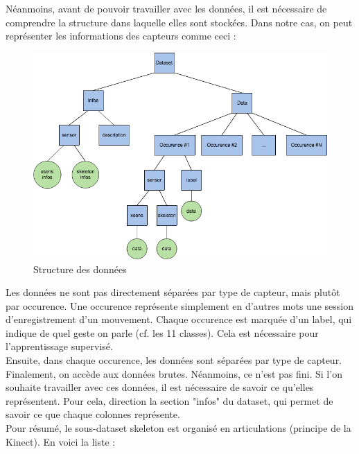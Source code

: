 Néanmoins, avant de pouvoir travailler avec les données, il est nécessaire de comprendre la structure dans laquelle elles sont stockées. Dans notre cas, on peut représenter les informations des capteurs comme ceci :

\begin{figure}[h]
  \centering
    \includegraphics[width=0.8\linewidth]{img/ann/extract/ann_dataset_mpri.png}
  \caption{Structure des données}
  \label{fig:dataset_mpri}
\end{figure}

Les données ne sont pas directement séparées par type de capteur, mais plutôt par occurence. Une occurence représente simplement en d'autres mots une session d'enregistrement d'un mouvement. Chaque occurence est marquée d'un label, qui indique de quel geste on parle (cf. les 11 classes). Cela est nécessaire pour l'apprentissage supervisé. \\

Ensuite, dans chaque occurence, les données sont séparées par type de capteur. Finalement, on accède aux données brutes. Néanmoins, ce n'est pas fini. Si l'on souhaite travailler avec ces données, il est nécessaire de savoir ce qu'elles représentent. Pour cela, direction la section "infos" du dataset, qui permet de savoir ce que chaque colonnes représente. \\

Pour résumé, le sous-dataset skeleton est organisé en articulations (principe de la Kinect). En voici la liste : \\

